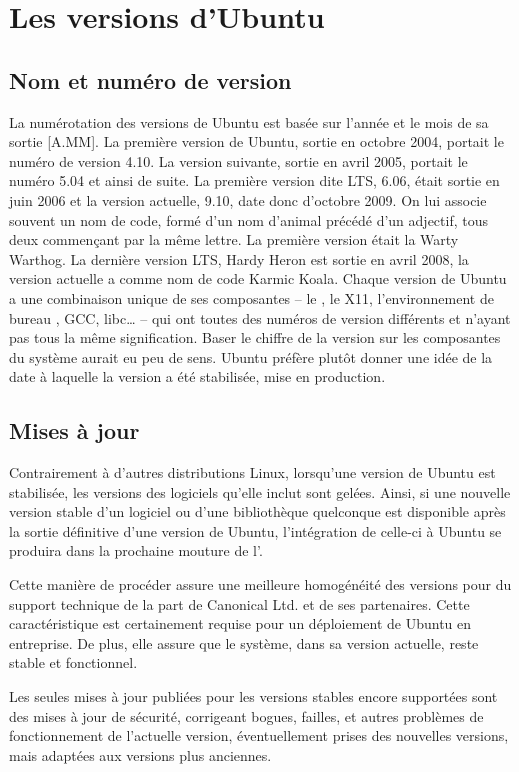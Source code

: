 \section{Les versions d'Ubuntu}
\label{RefVersionUbuntu}
\subsection{Nom et numéro de version}
La numérotation des versions de Ubuntu est basée sur l'année et le mois de sa sortie [A.MM]. La première version de Ubuntu, sortie en octobre 2004, portait le numéro de version 4.10. La version suivante, sortie en avril 2005, portait le numéro 5.04 et ainsi de suite. La première version dite LTS, 6.06, était sortie en juin 2006 et la version actuelle, 9.10, date donc d'octobre 2009. On lui associe souvent un nom de code, formé d'un nom d'animal précédé d'un adjectif, tous deux commençant par la même lettre. La première version était la Warty Warthog.
La dernière version LTS, Hardy Heron est sortie en avril 2008, la version actuelle a comme nom de code Karmic Koala.
Chaque version de Ubuntu a une combinaison unique de ses composantes -- le , le  X11, l'environnement de bureau , GCC, libc\ldots{} -- qui ont toutes des numéros de version différents et n'ayant pas tous la même signification. Baser le chiffre de la version sur les composantes du système aurait eu peu de sens. Ubuntu préfère plutôt donner une idée de la date à laquelle la version a été stabilisée, mise en production.
\subsection{Mises à jour}
Contrairement à d'autres distributions Linux, lorsqu'une version de Ubuntu est stabilisée, les versions des logiciels qu'elle inclut sont gelées. Ainsi, si une nouvelle version stable d'un logiciel ou d'une bibliothèque quelconque est disponible après la sortie définitive d'une version de Ubuntu, l'intégration de celle-ci à Ubuntu se produira dans la prochaine mouture de l'.\par
Cette manière de procéder assure une meilleure homogénéité des versions pour du support technique de la part de Canonical Ltd. et de ses partenaires. Cette caractéristique est certainement requise pour un déploiement de Ubuntu en entreprise. De plus, elle assure que le système, dans sa version actuelle, reste stable et fonctionnel.\par
Les seules mises à jour publiées pour les versions stables encore supportées sont des mises à jour de sécurité, corrigeant bogues, failles, et autres problèmes de fonctionnement de l'actuelle version, éventuellement prises des nouvelles versions, mais adaptées aux versions  plus anciennes.
